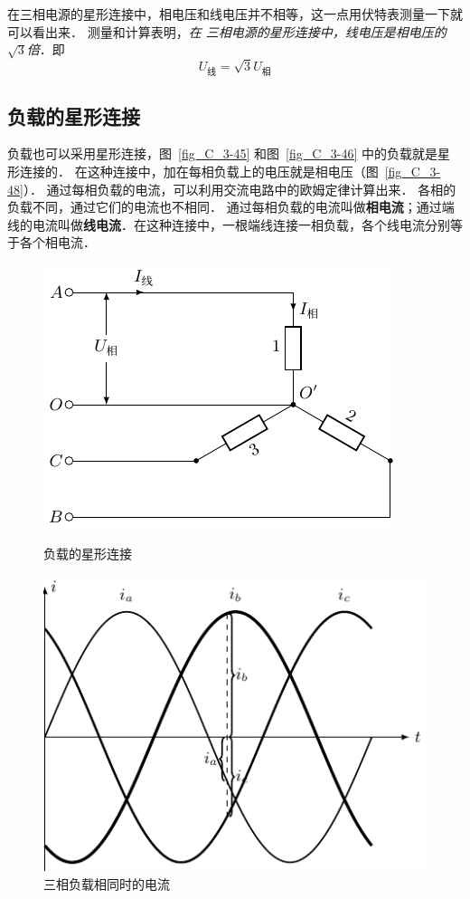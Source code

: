 在三相电源的星形连接中，相电压和线电压并不相等，这一点用伏特表测量一下就可以看出来．
测量和计算表明，\textit{在
三相电源的星形连接中，线电压是相电压的$\sqrt{3}$倍}．即
\[U_{\text{线}}=\sqrt{3}U_{\text{相}}\]

\subsection{负载的星形连接}


负载也可以采用星形连接，图~\ref{fig_C_3-45} 和图~\ref{fig_C_3-46} 中的负载就是星形连接的．
在这种连接中，加在每相负载上的电压就是相电压（图~\ref{fig_C_3-48}）．
通过每相负载的电流，可以利用交流电路中的欧姆定律计算出来．
各相的负载不同，通过它们的电流也不相同．
通过每相负载的电流叫做\textbf{相电流}；通过端线的电流叫做\textbf{线电流}．在这种连接中，一根端线连接一相负载，各个线电流分别等于各个相电流．
\begin{figure}[htbp]
    \centering
    \begin{minipage}[b]{0.47\linewidth}
    	\centering
    	 \includegraphics{fig/C/3-48.pdf}
    	\caption{负载的星形连接}\label{fig_C_3-48}
    \end{minipage}
    \begin{minipage}[b]{0.5\linewidth}
    	\centering
    	\includegraphics{fig/C/3-49.pdf}
    	\caption{三相负载相同时的电流}\label{fig_C_3-49}
    \end{minipage}
\end{figure}

